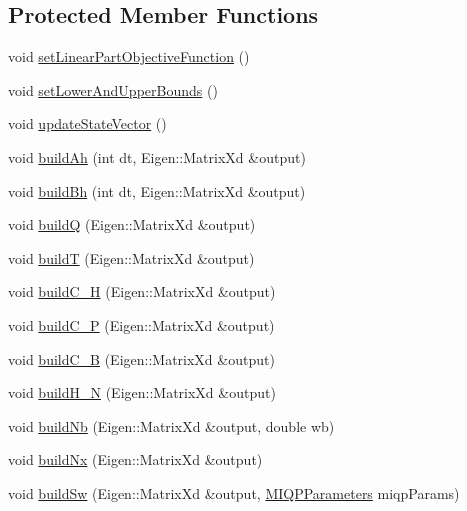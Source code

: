 \subsection*{\-Protected \-Member \-Functions}
\begin{DoxyCompactItemize}
\item 
void \hyperlink{classMIQPController_a2d882a4cd9e9832d8b9b2ad73111be0f}{set\-Linear\-Part\-Objective\-Function} ()
\item 
void \hyperlink{classMIQPController_a2caf42a5b5dcd63d67de57cfbb93c653}{set\-Lower\-And\-Upper\-Bounds} ()
\item 
void \hyperlink{classMIQPController_a8320465a1ec80d0cf7ba0d17652feba5}{update\-State\-Vector} ()
\item 
void \hyperlink{classMIQPController_aea16b6eac86da5330c7ffbfdb9c655f5}{build\-Ah} (int dt, \-Eigen\-::\-Matrix\-Xd \&output)
\item 
void \hyperlink{classMIQPController_afc2df705b1238e2503e35f07e2f8270a}{build\-Bh} (int dt, \-Eigen\-::\-Matrix\-Xd \&output)
\item 
void \hyperlink{classMIQPController_af492dfbff2e211ff1c1351c2193fe669}{build\-Q} (\-Eigen\-::\-Matrix\-Xd \&output)
\item 
void \hyperlink{classMIQPController_a52dc10cbc0941a6e4f4e6ffd462fffce}{build\-T} (\-Eigen\-::\-Matrix\-Xd \&output)
\item 
void \hyperlink{classMIQPController_aa58686fc2883ef2d81d3e6d3554b338d}{build\-C\-\_\-\-H} (\-Eigen\-::\-Matrix\-Xd \&output)
\item 
void \hyperlink{classMIQPController_ac2a454e236bdb3a13b72b6930329f231}{build\-C\-\_\-\-P} (\-Eigen\-::\-Matrix\-Xd \&output)
\item 
void \hyperlink{classMIQPController_a1be33f8ebb313f7ecddd2aa6af4fa62c}{build\-C\-\_\-\-B} (\-Eigen\-::\-Matrix\-Xd \&output)
\item 
void \hyperlink{classMIQPController_ab093df4b1c73c02a97609093fd037345}{build\-H\-\_\-\-N} (\-Eigen\-::\-Matrix\-Xd \&output)
\item 
void \hyperlink{classMIQPController_a8b83fba21208a3becff314d26ba45679}{build\-Nb} (\-Eigen\-::\-Matrix\-Xd \&output, double wb)
\item 
void \hyperlink{classMIQPController_a959d9957a931315d3f1cf95ad5c07a65}{build\-Nx} (\-Eigen\-::\-Matrix\-Xd \&output)
\item 
void \hyperlink{classMIQPController_a3085bba3c89e6ed0265e8e229590e7f1}{build\-Sw} (\-Eigen\-::\-Matrix\-Xd \&output, \hyperlink{structMIQPParameters}{\-M\-I\-Q\-P\-Parameters} miqp\-Params)

\end{DoxyCompactItemize}
